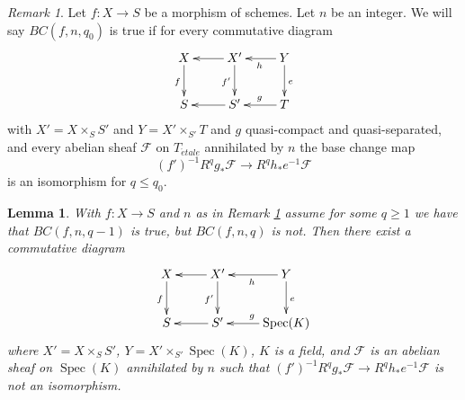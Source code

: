 \documentclass[10pt,a4paper]{amsart}
\theoremstyle{plain}
\newtheorem{lemma}[subsection]{Lemma}
\theoremstyle{definition}
\theoremstyle{remark}
\newtheorem{remark}[subsection]{Remark}
\numberwithin{equation}{subsection}
\def\Spec{\mathop{\mathrm{Spec}}}
\def\etale{{\acute{e}tale}}
\begin{document}
\begin{remark}
\label{remark-base-change-holds}
Let $f : X \to S$ be a morphism of schemes. Let $n$ be an integer.
We will say $BC(f, n, q_0)$ is true if for every commutative diagram
$$
\xymatrix{
X \ar[d]_f & X' \ar[l] \ar[d]_{f'} & Y \ar[l]^h \ar[d]^e \\
S & S' \ar[l] & T \ar[l]_g
}
$$
with $X' = X \times_S S'$ and $Y = X' \times_{S'} T$ and
$g$ quasi-compact and quasi-separated, and every abelian sheaf
$\mathcal{F}$ on $T_\etale$ annihilated by $n$ the base change map
$$
(f')^{-1}R^qg_*\mathcal{F}
\longrightarrow
R^qh_*e^{-1}\mathcal{F}
$$
is an isomorphism for $q \leq q_0$.
\end{remark}

\begin{lemma}
\label{lemma-base-change-does-not-hold-pre}
With $f : X \to S$ and $n$ as in Remark \ref{remark-base-change-holds}
assume for some $q \geq 1$ we have that $BC(f, n, q - 1)$ is true, but
$BC(f, n, q)$ is not. Then there exist a commutative diagram
$$
\xymatrix{
X \ar[d]_f & X' \ar[d]_{f'} \ar[l] & Y \ar[l]^h \ar[d]^e \\
S & S' \ar[l] & \Spec(K) \ar[l]_g
}
$$
where $X' = X \times_S S'$, $Y = X' \times_{S'} \Spec(K)$,
$K$ is a field, and $\mathcal{F}$ is an abelian sheaf
on $\Spec(K)$ annihilated by $n$ such that
$(f')^{-1}R^qg_*\mathcal{F} \to R^qh_*e^{-1}\mathcal{F}$
is not an isomorphism.
\end{lemma}
\end{document}
